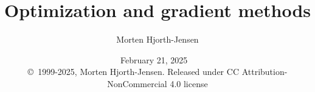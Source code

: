 \documentclass{beamer}
\begin{document}

\newcommand{\exercisesection}[1]{\subsection*{#1}}







\title{Optimization and gradient methods}


\author{Morten Hjorth-Jensen}

\date{February 21, 2025
\ \\ 
{\tiny \copyright\ 1999-2025, Morten Hjorth-Jensen. Released under CC Attribution-NonCommercial 4.0 license}
}


\begin{frame}
\titlepage
\end{frame}
\end{document}
